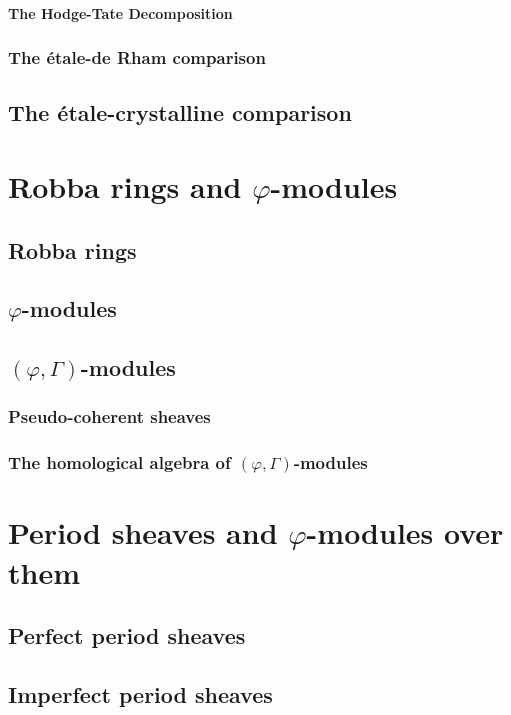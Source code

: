                     \begin{remark}
                        
                    \end{remark}
                
                \paragraph{The Hodge-Tate Decomposition}
            
            \subsubsection{The \'etale-de Rham comparison}
        
        \subsection{The \'etale-crystalline comparison}
    
    \section{Robba rings and \texorpdfstring{$\varphi$}{}-modules}
        \subsection{Robba rings}
        
        \subsection{\texorpdfstring{$\varphi$}{}-modules}
    
        \subsection{\texorpdfstring{$(\varphi, \Gamma)$}{}-modules}
            \subsubsection{Pseudo-coherent sheaves}
            
            \subsubsection{The homological algebra of \texorpdfstring{$(\varphi, \Gamma)$}{}-modules}
    
    \section{Period sheaves and \texorpdfstring{$\varphi$}{}-modules over them}
        \subsection{Perfect period sheaves}
        
        \subsection{Imperfect period sheaves}